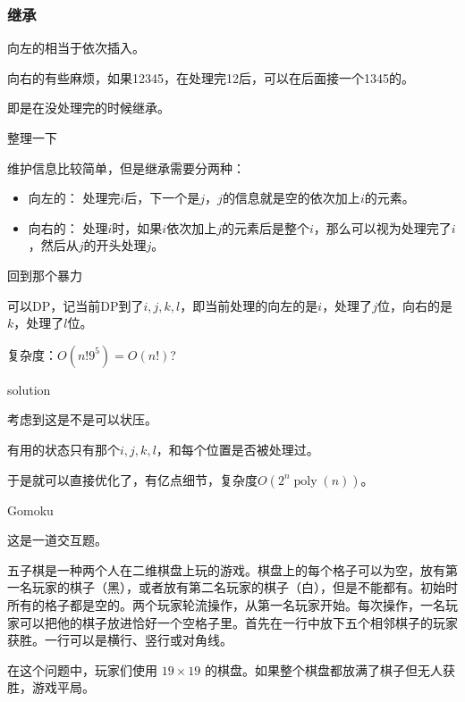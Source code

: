 \documentclass[10pt]{beamer}
\begin{document}
	\clearpage
	\begin{frame}
		\frametitle{继承}

		向左的相当于依次插入。

		向右的有些麻烦，如果12345，在处理完12后，可以在后面接一个1345的。
		
		即是在没处理完的时候继承。
	\end{frame}
	\clearpage
	\begin{frame}{整理一下}
	
		维护信息比较简单，但是继承需要分两种：

		\begin{itemize}
			\item 向左的： 处理完$i$后，下一个是$j$，$j$的信息就是空的依次加上$i$的元素。
			\item 向右的： 处理$i$时，如果$i$依次加上$j$的元素后是整个$i$，那么可以视为处理完了$i$，然后从$j$的开头处理$j$。
		\end{itemize}
	
	\end{frame}
	\clearpage
	\begin{frame}{回到那个暴力}
	
		可以DP，记当前DP到了$i,j,k,l$，即当前处理的向左的是$i$，处理了$j$位，向右的是$k$，处理了$l$位。

		复杂度：$O(n!9^5)=O(n!)$?
	
	\end{frame}
	\clearpage
	\begin{frame}{solution}
	
		考虑到这是不是可以状压。

		有用的状态只有那个$i,j,k,l$，和每个位置是否被处理过。

		于是就可以直接优化了，有亿点细节，复杂度$O(2^n\operatorname{poly}(n))$。
	\end{frame}
	\clearpage
	\begin{frame}{Gomoku}
	
		这是一道交互题。

		五子棋是一种两个人在二维棋盘上玩的游戏。棋盘上的每个格子可以为空，放有第一名玩家的棋子（黑），或者放有第二名玩家的棋子（白），但是不能都有。初始时所有的格子都是空的。两个玩家轮流操作，从第一名玩家开始。每次操作，一名玩家可以把他的棋子放进恰好一个空格子里。首先在一行中放下五个相邻棋子的玩家获胜。一行可以是横行、竖行或对角线。

		在这个问题中，玩家们使用 $19\times 19$ 的棋盘。如果整个棋盘都放满了棋子但无人获胜，游戏平局。
	\end{frame}
	\clearpage
\end{document}
